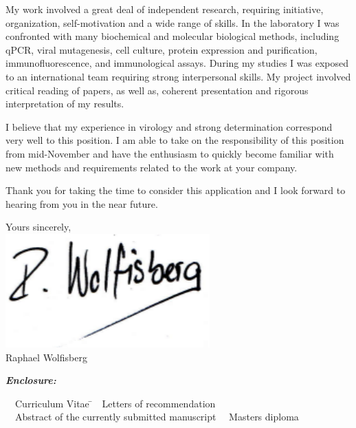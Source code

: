 \documentclass[11pt, a4paper]{article}
\begin{document}
\medskip
My work involved a great deal of independent research, requiring initiative, organization, self-motivation and a wide range of skills. In the laboratory I was confronted with many biochemical and molecular biological methods, including qPCR, viral mutagenesis, cell culture, protein expression and purification, immunofluorescence, and immunological assays. During my studies I was exposed to an international team requiring strong interpersonal skills. My project involved critical reading of papers, as well as, coherent presentation and rigorous interpretation of my results.

\medskip
I believe that my experience in virology and strong determination correspond very well to this position. I am able to take on the responsibility of this position from mid-November and have the enthusiasm to quickly become familiar with new methods and requirements related to the work at your company.

\bigskip
Thank you for taking the time to consider this application and I look forward to hearing from you in the near future.

\bigskip
\medskip
Yours sincerely, \\ [0.5 cm]
\includegraphics[scale=0.6, trim=0mm 3mm 0mm 0mm]{Signature} \\
Raphael Wolfisberg\\ 
\bigskip
\bigskip

\textbf{\emph{Enclosure:}} 
\vspace{-0.15 cm}


\begin{tabbing}

\textbullet~~Curriculum Vitae \hspace{6 cm} \= \textbullet~~Letters of recommendation \\
\textbullet~~Abstract of the currently submitted manuscript \> \textbullet~~Masters diploma

\end{tabbing}
\end{document}
